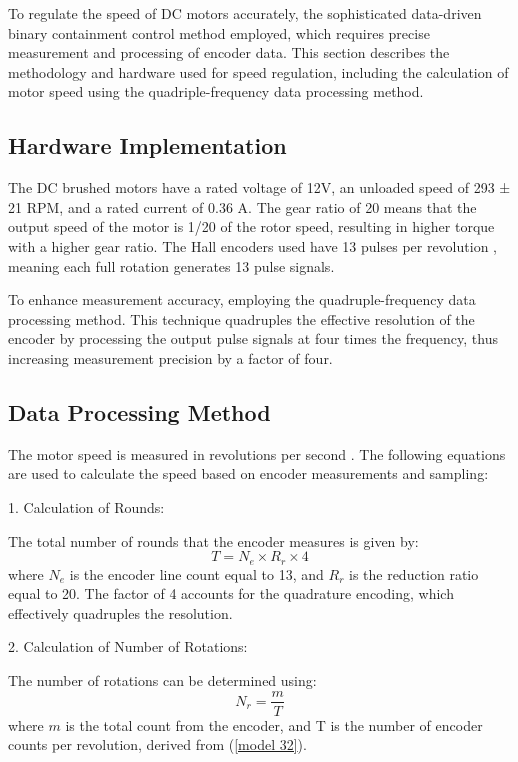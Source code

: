 \documentclass[journal,onecolumn]{IEEEtran}
\begin{document}
To regulate the speed of DC motors accurately, the sophisticated data-driven binary containment control method employed, which requires precise measurement and processing of encoder data. This section describes the methodology and hardware used for speed regulation, including the calculation of motor speed using the quadriple-frequency data processing  method.

\subsection{Hardware Implementation}

The DC brushed motors have a rated voltage of 12V, an unloaded speed of 293 ± 21 RPM, and a rated current of 0.36 A. The gear ratio of 20 means that the output speed of the motor is 1/20 of the rotor speed, resulting in higher torque with a higher gear ratio. The Hall encoders used have 13 pulses per revolution , meaning each full rotation generates 13 pulse signals. 

To enhance measurement accuracy, employing the quadruple-frequency data processing method. This technique quadruples the effective resolution of the encoder by processing the output pulse signals at four times the frequency, thus increasing measurement precision by a factor of four.

\subsection{Data Processing Method}

The motor speed is measured in revolutions per second . The following equations are used to calculate the speed based on encoder measurements and sampling:

1. Calculation of Rounds:

   The total number of rounds that the encoder measures is given by:
   \begin{equation}
       \label{model 32}
       T = N_e \times R_r \times 4
   \end{equation}
   where $N_e$ is the encoder line count equal to 13, and $R_r$ is the reduction ratio equal to 20. The factor of 4 accounts for the quadrature encoding, which effectively quadruples the resolution.

2. Calculation of Number of Rotations:

   The number of rotations can be determined using:
   \begin{equation}
       \label{model 33}
       N_r = \frac{m}{ T}
   \end{equation}
   where \( m \) is the total count from the encoder, and T is the number of encoder counts per revolution, derived from (\ref{model 32}).
\end{document}
